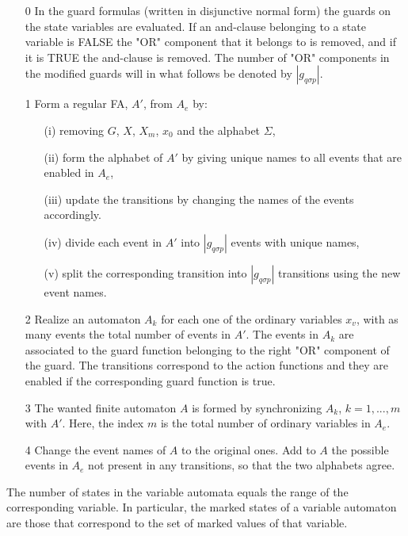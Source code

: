 \documentclass{article}
\begin{document}
\begin{enumerate}
   \item [0] In the guard formulas (written in disjunctive normal form) the guards on
             the state variables are evaluated. If an and-clause belonging to a state variable is
             FALSE the "OR" component that it belongs to is removed, and if it is TRUE the and-clause
             is removed. The number of "OR" components in the modified
             guards will in what follows be denoted by $|g_{q \sigma p}|$.

   \item [1] Form a regular FA, $A'$, from $A_{e}$ by:
   \begin{enumerate}
   \item [(i)] removing $G$, $X$, $X_m$, $x_0$ and the alphabet $\Sigma$,

   \item [(ii)] form the alphabet of $A'$ by giving unique names to all events that are enabled in $A_{e}$,

   \item [(iii)] update the transitions by changing the names of the events accordingly.

   \item [(iv)] divide each event in $A'$ into $|g_{q \sigma p}|$ events with unique
   names,
   \item [(v)] split the corresponding transition into $|g_{q \sigma p}|$
transitions using the new event names.

   \end{enumerate}


 \item [2]  Realize an automaton $A_{k}$ for each one of the ordinary variables $x_{v}$,
 with as many events the total number of events in $A'$. The events in $A_k$ are associated
 to the guard function belonging
 to the right "OR" component of the guard. The transitions
correspond to the action functions and they are enabled if the corresponding
guard function is true.
 \item [3]  The wanted finite automaton $A$ is formed by synchronizing $A_{k}$, $k=1,...,m$ with $A'$.
 Here, the index $m$ is the total number of ordinary variables in $A_e$.
 \item [4] Change the event names of $A$ to the original ones. Add to $A$ the possible events
 in $A_{e}$ not present in any transitions, so that the two alphabets agree.
\end{enumerate}
The number of states in the variable automata equals the range of the corresponding variable.
In particular, the marked states of a variable automaton are those that correspond to the set
of marked values of that variable.
\end{document}
